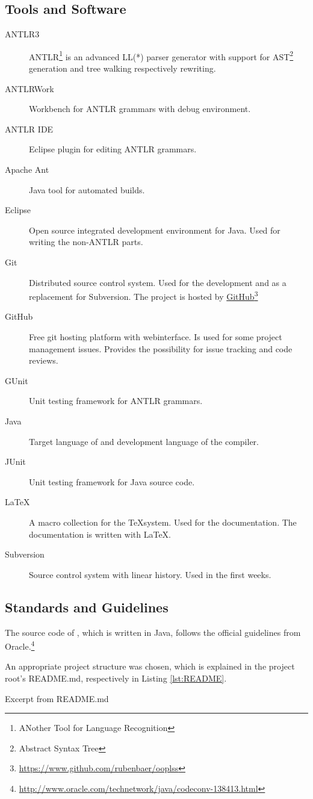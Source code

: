 \subsection{Tools and Software}
\begin{description}
	\item[ANTLR3] ANTLR\footnote{ANother Tool for Language
	Recognition} is an advanced LL(*) parser generator with support
	for AST\footnote{Abstract Syntax Tree} generation and tree
	walking respectively rewriting.
	\item[ANTLRWork] Workbench for ANTLR grammars with debug
	environment.
	\item[ANTLR IDE] Eclipse plugin for editing ANTLR grammars.
	\item[Apache Ant] Java tool for automated builds.
	\item[Eclipse] Open source integrated development environment
	for Java. Used for writing the non-ANTLR parts.
	\item[Git] Distributed source control system. Used for the
	development and as a replacement for Subversion. The project is
	hosted by \href{https://www.github.com/rubenbaer/ooplss}{GitHub}\footnote{\href{https://www.github.com/rubenbaer/ooplss}{https://www.github.com/rubenbaer/ooplss}}
	\item[GitHub] Free git hosting platform with webinterface. Is
	used for some project management issues. Provides the possibility
	for issue tracking and code reviews.
	\item[GUnit] Unit testing framework for ANTLR grammars.
	\item[Java] Target language of \ooplss and development language
	of the compiler.
	\item[JUnit] Unit testing framework for Java source code.
	\item[\LaTeX] A macro collection for the \TeX system. Used for
	the documentation. The documentation is written with \LaTeX.
	\item[Subversion] Source control system with linear history. Used
	in the first weeks.
\end{description}

\subsection{Standards and Guidelines}
The source code of \ooplss, which is written
in Java, follows the official guidelines from
Oracle.\footnote{\href{http://www.oracle.com/technetwork/java/codeconv-138413.html}{http://www.oracle.com/technetwork/java/codeconv-138413.html}}

An appropriate project structure was chosen, which is explained in the
project root's README.md, respectively in Listing \ref{lst:README}.

\begin{listing}
	\caption{Excerpt from README.md}
	\label{lst:README}
\end{listing}
